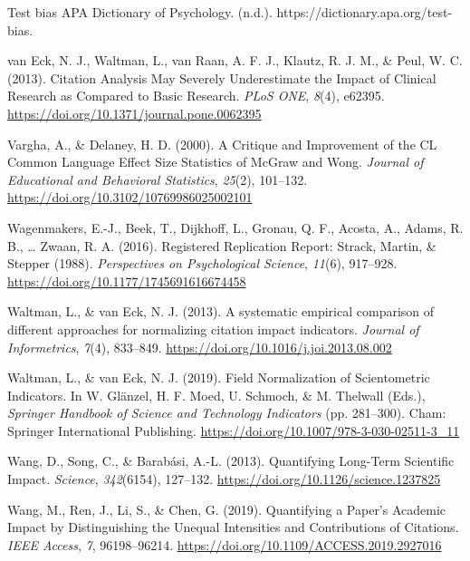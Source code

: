 \documentclass[
  english,
  jou,floatsintext]{apa6}
\newlength{\cslhangindent}
\newenvironment{cslreferences}%
  {\setlength{\parindent}{0pt}%
  \everypar{\setlength{\hangindent}{\cslhangindent}}\ignorespaces}%
  {\par}
\begin{document}
\begin{cslreferences}
\leavevmode\hypertarget{ref-zotero-3728}{}%
Test bias APA Dictionary of Psychology. (n.d.). https://dictionary.apa.org/test-bias.

\leavevmode\hypertarget{ref-VanEck2013}{}%
van Eck, N. J., Waltman, L., van Raan, A. F. J., Klautz, R. J. M., \& Peul, W. C. (2013). Citation Analysis May Severely Underestimate the Impact of Clinical Research as Compared to Basic Research. \emph{PLoS ONE}, \emph{8}(4), e62395. \url{https://doi.org/10.1371/journal.pone.0062395}

\leavevmode\hypertarget{ref-Vargha2000}{}%
Vargha, A., \& Delaney, H. D. (2000). A Critique and Improvement of the CL Common Language Effect Size Statistics of McGraw and Wong. \emph{Journal of Educational and Behavioral Statistics}, \emph{25}(2), 101--132. \url{https://doi.org/10.3102/10769986025002101}

\leavevmode\hypertarget{ref-Wagenmakers2016}{}%
Wagenmakers, E.-J., Beek, T., Dijkhoff, L., Gronau, Q. F., Acosta, A., Adams, R. B., \ldots{} Zwaan, R. A. (2016). Registered Replication Report: Strack, Martin, \& Stepper (1988). \emph{Perspectives on Psychological Science}, \emph{11}(6), 917--928. \url{https://doi.org/10.1177/1745691616674458}

\leavevmode\hypertarget{ref-Waltman2013}{}%
Waltman, L., \& van Eck, N. J. (2013). A systematic empirical comparison of different approaches for normalizing citation impact indicators. \emph{Journal of Informetrics}, \emph{7}(4), 833--849. \url{https://doi.org/10.1016/j.joi.2013.08.002}

\leavevmode\hypertarget{ref-Waltman2019}{}%
Waltman, L., \& van Eck, N. J. (2019). Field Normalization of Scientometric Indicators. In W. Glänzel, H. F. Moed, U. Schmoch, \& M. Thelwall (Eds.), \emph{Springer Handbook of Science and Technology Indicators} (pp. 281--300). Cham: Springer International Publishing. \url{https://doi.org/10.1007/978-3-030-02511-3_11}

\leavevmode\hypertarget{ref-Wang2013}{}%
Wang, D., Song, C., \& Barabási, A.-L. (2013). Quantifying Long-Term Scientific Impact. \emph{Science}, \emph{342}(6154), 127--132. \url{https://doi.org/10.1126/science.1237825}

\leavevmode\hypertarget{ref-Wang2019}{}%
Wang, M., Ren, J., Li, S., \& Chen, G. (2019). Quantifying a Paper's Academic Impact by Distinguishing the Unequal Intensities and Contributions of Citations. \emph{IEEE Access}, \emph{7}, 96198--96214. \url{https://doi.org/10.1109/ACCESS.2019.2927016}


\end{cslreferences}
\end{document}
